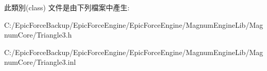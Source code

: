 此類別(class) 文件是由下列檔案中產生\+:\begin{DoxyCompactItemize}
\item 
C\+:/\+Epic\+Force\+Backup/\+Epic\+Force\+Engine/\+Epic\+Force\+Engine/\+Magnum\+Engine\+Lib/\+Magnum\+Core/Triangle3.\+h\item 
C\+:/\+Epic\+Force\+Backup/\+Epic\+Force\+Engine/\+Epic\+Force\+Engine/\+Magnum\+Engine\+Lib/\+Magnum\+Core/Triangle3.\+inl\end{DoxyCompactItemize}
